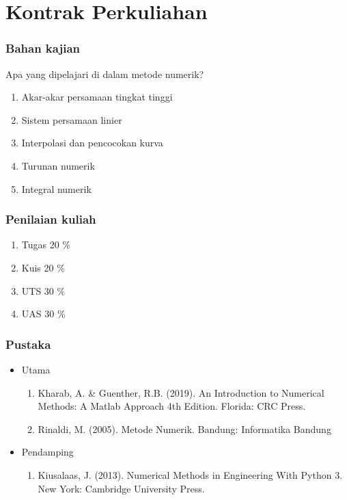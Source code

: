 \documentclass[pdflatex,compress]{beamer}
\begin{document}
\section{Kontrak Perkuliahan}

\begin{frame}
	\frametitle{Bahan kajian}
	Apa yang dipelajari di dalam metode numerik?
	\begin{enumerate}
		\item Akar-akar persamaan tingkat tinggi
		\item Sistem persamaan linier
		\item Interpolasi dan pencocokan kurva
		\item Turunan numerik
		\item Integral numerik
	\end{enumerate}
\end{frame}

\begin{frame}
	\frametitle{Penilaian kuliah}
	\begin{enumerate}
		\item Tugas 20 \%
		\item Kuis 20 \%
		\item UTS 30 \%
		\item UAS 30 \%
	\end{enumerate}
\end{frame}

\begin{frame}
	\frametitle{Pustaka}
	\begin{itemize}
		\item Utama
		\begin{enumerate}
			\item Kharab, A. \& Guenther, R.B. (2019). An Introduction to Numerical Methods: A Matlab Approach 4th Edition. Florida: CRC Press.
			\item Rinaldi, M. (2005). Metode Numerik. Bandung: Informatika Bandung
		\end{enumerate}
		\item Pendamping
		\begin{enumerate}
			\item Kiusalaas, J. (2013). Numerical Methods in Engineering With Python 3. New York: Cambridge University Press.
		\end{enumerate}
	\end{itemize}
\end{frame}
\end{document}
